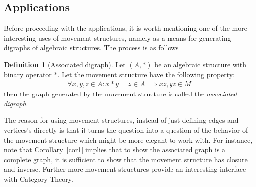 \documentclass[a4paper,11pt]{article}
\theoremstyle{plain}
\theoremstyle{definition}
\newtheorem{definition}[theorem]{Definition}
\begin{document}
\subsection{Applications}
Before proceeding with the applications, it is worth mentioning one of
the more interesting uses of movement structures, namely as a means for
generating digraphs of algebraic structures. The process is as follows
\begin{definition}[Associated digraph]\label{as digraph}
	Let $(A,*)$ be an algebraic structure with binary operator $*$. Let the
	movement structure have the following property:
	\begin{equation}
	\begin{aligned}
		\forall x,y,z\in A: x*y=z\in A\implies xz,yz\in M
	\end{aligned}
	\end{equation}
	then the graph generated by the movement structure is called the
	\textit{associated digraph}.
\end{definition}
The reason for using movement structures, instead of just defining edges and
vertices's directly is that it turns the question into a question of the
behavior of the movement structure which might be more elegant to work with. For
instance, note that Corollary~\ref{cor1} implies that to show the associated
graph is a complete graph, it is sufficient to show that the movement structure
has closure and inverse. Further more movement structures provide an interesting 
interface with Category Theory.
\end{document}
